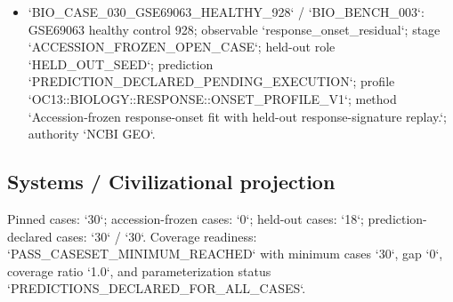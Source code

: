 \begin{itemize}
\item `BIO\_CASE\_030\_GSE69063\_HEALTHY\_928` / `BIO\_BENCH\_003`: GSE69063 healthy control 928; observable `response\_onset\_residual`; stage `ACCESSION\_FROZEN\_OPEN\_CASE`; held-out role `HELD\_OUT\_SEED`; prediction `PREDICTION\_DECLARED\_PENDING\_EXECUTION`; profile `OC13::BIOLOGY::RESPONSE::ONSET\_PROFILE\_V1`; method `Accession-frozen response-onset fit with held-out response-signature replay.`; authority `NCBI GEO`.
\end{itemize}

\subsection{Systems / Civilizational projection}
Pinned cases: `30`; accession-frozen cases: `0`; held-out cases: `18`; prediction-declared cases: `30` / `30`.
Coverage readiness: `PASS\_CASESET\_MINIMUM\_REACHED` with minimum cases `30`, gap `0`, coverage ratio `1.0`, and parameterization status `PREDICTIONS\_DECLARED\_FOR\_ALL\_CASES`.
